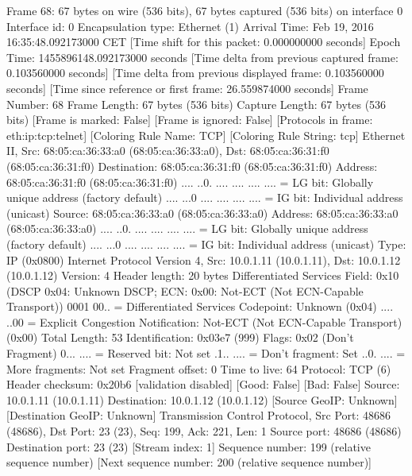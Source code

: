 Frame 68: 67 bytes on wire (536 bits), 67 bytes captured (536 bits) on interface 0
    Interface id: 0
    Encapsulation type: Ethernet (1)
    Arrival Time: Feb 19, 2016 16:35:48.092173000 CET
    [Time shift for this packet: 0.000000000 seconds]
    Epoch Time: 1455896148.092173000 seconds
    [Time delta from previous captured frame: 0.103560000 seconds]
    [Time delta from previous displayed frame: 0.103560000 seconds]
    [Time since reference or first frame: 26.559874000 seconds]
    Frame Number: 68
    Frame Length: 67 bytes (536 bits)
    Capture Length: 67 bytes (536 bits)
    [Frame is marked: False]
    [Frame is ignored: False]
    [Protocols in frame: eth:ip:tcp:telnet]
    [Coloring Rule Name: TCP]
    [Coloring Rule String: tcp]
Ethernet II, Src: 68:05:ca:36:33:a0 (68:05:ca:36:33:a0), Dst: 68:05:ca:36:31:f0 (68:05:ca:36:31:f0)
    Destination: 68:05:ca:36:31:f0 (68:05:ca:36:31:f0)
        Address: 68:05:ca:36:31:f0 (68:05:ca:36:31:f0)
        .... ..0. .... .... .... .... = LG bit: Globally unique address (factory default)
        .... ...0 .... .... .... .... = IG bit: Individual address (unicast)
    Source: 68:05:ca:36:33:a0 (68:05:ca:36:33:a0)
        Address: 68:05:ca:36:33:a0 (68:05:ca:36:33:a0)
        .... ..0. .... .... .... .... = LG bit: Globally unique address (factory default)
        .... ...0 .... .... .... .... = IG bit: Individual address (unicast)
    Type: IP (0x0800)
Internet Protocol Version 4, Src: 10.0.1.11 (10.0.1.11), Dst: 10.0.1.12 (10.0.1.12)
    Version: 4
    Header length: 20 bytes
    Differentiated Services Field: 0x10 (DSCP 0x04: Unknown DSCP; ECN: 0x00: Not-ECT (Not ECN-Capable Transport))
        0001 00.. = Differentiated Services Codepoint: Unknown (0x04)
        .... ..00 = Explicit Congestion Notification: Not-ECT (Not ECN-Capable Transport) (0x00)
    Total Length: 53
    Identification: 0x03e7 (999)
    Flags: 0x02 (Don't Fragment)
        0... .... = Reserved bit: Not set
        .1.. .... = Don't fragment: Set
        ..0. .... = More fragments: Not set
    Fragment offset: 0
    Time to live: 64
    Protocol: TCP (6)
    Header checksum: 0x20b6 [validation disabled]
        [Good: False]
        [Bad: False]
    Source: 10.0.1.11 (10.0.1.11)
    Destination: 10.0.1.12 (10.0.1.12)
    [Source GeoIP: Unknown]
    [Destination GeoIP: Unknown]
Transmission Control Protocol, Src Port: 48686 (48686), Dst Port: 23 (23), Seq: 199, Ack: 221, Len: 1
    Source port: 48686 (48686)
    Destination port: 23 (23)
    [Stream index: 1]
    Sequence number: 199    (relative sequence number)
    [Next sequence number: 200    (relative sequence number)]
